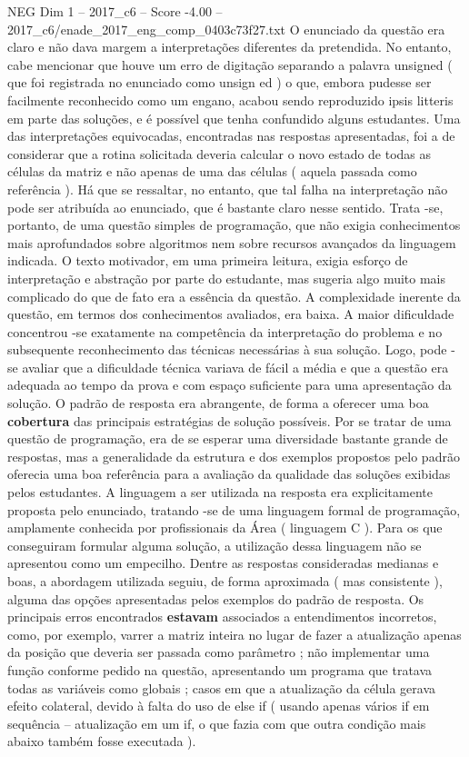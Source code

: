\begin{textsample}{NEG Dim 1 – 2017\_c6 – Score -4.00 – 2017\_c6/enade\_2017\_eng\_comp\_0403c73f27.txt}
O enunciado da questão era claro e não dava margem a interpretações diferentes da pretendida.
No entanto, cabe mencionar que houve um erro de digitação separando a palavra unsigned ( que foi registrada no enunciado como unsign ed ) o que, embora pudesse ser facilmente reconhecido como um engano, acabou sendo reproduzido ipsis litteris em parte das soluções, e é possível que tenha confundido alguns estudantes.
Uma das interpretações equivocadas, encontradas nas respostas apresentadas, foi a de considerar que a rotina solicitada deveria calcular o novo estado de todas as células da matriz e não apenas de uma das células ( aquela passada como referência ).
Há que se ressaltar, no entanto, que tal falha na interpretação não pode ser atribuída ao enunciado, que é bastante claro nesse sentido.
Trata -se, portanto, de uma questão simples de programação, que não exigia conhecimentos mais aprofundados sobre algoritmos nem sobre recursos avançados da linguagem indicada.
O texto motivador, em uma primeira leitura, exigia esforço de interpretação e abstração por parte do estudante, mas sugeria algo muito mais complicado do que de fato era a essência da questão.
A complexidade inerente da questão, em termos dos conhecimentos avaliados, era baixa.
A maior dificuldade concentrou -se exatamente na competência da interpretação do problema e no subsequente reconhecimento das técnicas necessárias à sua solução.
Logo, pode -se avaliar que a dificuldade técnica variava de fácil a média e que a questão era adequada ao tempo da prova e com espaço suficiente para uma apresentação da solução.
O padrão de resposta era abrangente, de forma a oferecer uma boa \textbf{cobertura} das principais estratégias de solução possíveis.
Por se tratar de uma questão de programação, era de se esperar uma diversidade bastante grande de respostas, mas a generalidade da estrutura e dos exemplos propostos pelo padrão oferecia uma boa referência para a avaliação da qualidade das soluções exibidas pelos estudantes.
A linguagem a ser utilizada na resposta era explicitamente proposta pelo enunciado, tratando -se de uma linguagem formal de programação, amplamente conhecida por profissionais da Área ( linguagem C ).
Para os que conseguiram formular alguma solução, a utilização dessa linguagem não se apresentou como um empecilho.
Dentre as respostas consideradas medianas e boas, a abordagem utilizada seguiu, de forma aproximada ( mas consistente ), alguma das opções apresentadas pelos exemplos do padrão de resposta.
Os principais erros encontrados \textbf{estavam} associados a entendimentos incorretos, como, por exemplo, varrer a matriz inteira no lugar de fazer a atualização apenas da posição que deveria ser passada como parâmetro ; não implementar uma função conforme pedido na questão, apresentando um programa que tratava todas as variáveis como globais ; casos em que a atualização da célula gerava efeito colateral, devido à falta do uso de else if ( usando apenas vários if em sequência – atualização em um if, o que fazia com que outra condição mais abaixo também fosse executada ).

\end{textsample}
